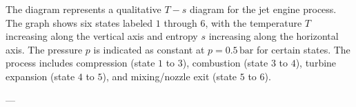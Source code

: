 The diagram represents a qualitative \( T-s \) diagram for the jet engine process. The graph shows six states labeled \( 1 \) through \( 6 \), with the temperature \( T \) increasing along the vertical axis and entropy \( s \) increasing along the horizontal axis. The pressure \( p \) is indicated as constant at \( p = 0.5 \, \text{bar} \) for certain states. The process includes compression (state \( 1 \) to \( 3 \)), combustion (state \( 3 \) to \( 4 \)), turbine expansion (state \( 4 \) to \( 5 \)), and mixing/nozzle exit (state \( 5 \) to \( 6 \)).  

---